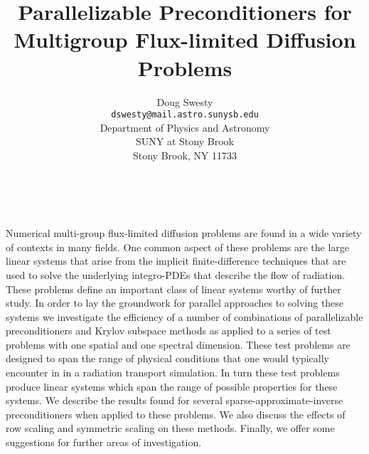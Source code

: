 \documentclass[11pt]{article}
\date{ ~ \hspace{-4mm}}
\title{Parallelizable Preconditioners for Multigroup Flux-limited Diffusion Problems   }
\author{Doug Swesty \\ {\tt dswesty@mail.astro.sunysb.edu} \\ Department of Physics and Astronomy \\ SUNY at Stony Brook \\ Stony Brook, NY 11733}
\begin{document}
\maketitle
\thispagestyle{empty}





 



Numerical multi-group flux-limited diffusion problems are found in a
wide variety of contexts in many fields.  One common aspect of these
problems are the large linear systems that arise from the implicit
finite-difference techniques that are used to solve the underlying
integro-PDEs that describe the flow of radiation.  These problems
define an important class of linear systems worthy of further study.
In order to lay the groundwork for parallel approaches to solving
these systems we investigate the efficiency of a number of
combinations of parallelizable preconditioners and Krylov subspace
methods as applied to a series of test problems with one spatial and
one spectral dimension.  These test problems are designed to span the
range of physical conditions that one would typically encounter in in
a radiation transport simulation.  In turn these test problems produce
linear systems which span the range of possible properties for these
systems.  We describe the results found for several
sparse-approximate-inverse preconditioners when applied to these
problems.  We also discuss the effects of row scaling and symmetric
scaling on these methods.  Finally, we offer some suggestions for
further areas of investigation.
\end{document}
